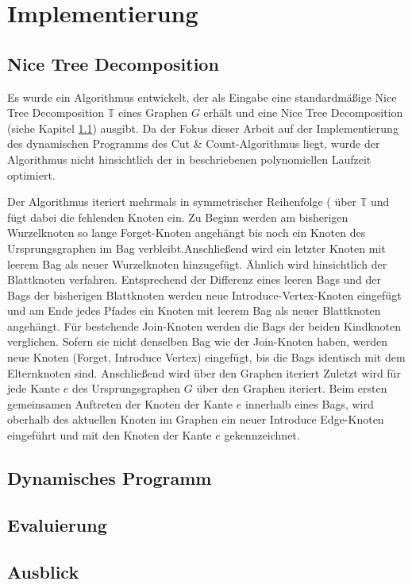 %
%
%
\chapter{Implementierung}
\label{c:impl} %

\section{Nice Tree Decomposition}
\label{sec:impl_ntd}
Es wurde ein Algorithmus entwickelt, der als Eingabe eine standardmäßige Nice Tree Decomposition $\mathbb{T}$ eines Graphen $G$ erhält und eine Nice Tree Decomposition (siehe Kapitel \ref{sec:impl_ntd}) ausgibt. Da der Fokus dieser Arbeit auf der Implementierung des dynamischen Programms des Cut \& Count-Algorithmus liegt, wurde der Algorithmus nicht hinsichtlich der in \cite{kloks1994} beschriebenen polynomiellen Laufzeit optimiert. 

Der Algorithmus iteriert mehrmals in symmetrischer Reihenfolge ( über $\mathbb{T}$ und fügt dabei die fehlenden Knoten ein. Zu Beginn werden am bisherigen Wurzelknoten so lange \glqq Forget\grqq -Knoten angehängt bis noch ein Knoten des Ursprungsgraphen im Bag verbleibt.Anschließend wird ein letzter Knoten mit leerem Bag als neuer Wurzelknoten hinzugefügt. Ähnlich wird hinsichtlich der Blattknoten verfahren. Entsprechend der Differenz eines leeren Bags und der Bags der bisherigen Blattknoten werden neue \glqq Introduce-Vertex\grqq -Knoten eingefügt und am Ende jedes Pfades ein Knoten mit leerem Bag als neuer Blattknoten angehängt. Für bestehende \glqq Join\grqq -Knoten werden die Bags der beiden Kindknoten verglichen. Sofern sie nicht denselben Bag wie der \glqq Join\grqq -Knoten haben, werden neue Knoten (\glqq Forget\grqq , \glqq Introduce Vertex\grqq ) eingefügt, bis die Bags identisch mit dem Elternknoten sind. 
Anschließend wird über den Graphen iteriert
Zuletzt wird für jede Kante $e$ des Ursprungsgraphen $G$ über den Graphen iteriert. Beim ersten gemeinsamen Auftreten der Knoten der Kante $e$ innerhalb eines Bags, wird oberhalb des aktuellen Knoten im Graphen ein neuer \glqq Introduce Edge\grqq -Knoten eingeführt und mit den Knoten der Kante $e$ gekennzeichnet.

\section{Dynamisches Programm}
\label{sec:impl_dynP}

\section{Evaluierung}
\label{sec:eval}

\section{Ausblick}
\label{sec:outlook}
